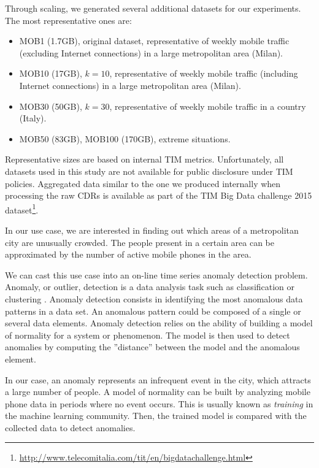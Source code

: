 {Through scaling, we generated several additional datasets for our experiments. The most representative ones are:
\begin{itemize}
\item MOB1 (1.7GB), original dataset, representative of weekly mobile traffic (excluding Internet connections) in a large metropolitan area (Milan).
\item MOB10 (17GB), $k = 10$, representative of weekly mobile traffic (including Internet connections) in a large metropolitan area (Milan).
\item MOB30 (50GB), $k = 30$, representative of weekly mobile traffic in a country (Italy).
\item MOB50 (83GB), MOB100 (170GB), extreme situations.
\end{itemize}
Representative sizes are based on internal TIM metrics. Unfortunately, all datasets used in this study are not available for public disclosure under TIM policies. Aggregated data similar to the one we produced internally when processing the raw CDRs is available as part of the TIM Big Data challenge 2015 dataset\footnote{\url{http://www.telecomitalia.com/tit/en/bigdatachallenge.html}}.

In our use case, we are interested in finding out which areas of a metropolitan city are unusually crowded. The people present in a certain area can be approximated by the number of active mobile phones in the area.

We can cast this use case into an on-line time series anomaly detection problem. Anomaly, or outlier, detection is a data analysis task such as classification or clustering \cite{aggarwal2015outlier}. Anomaly detection consists in identifying the most anomalous data patterns in a data set. An anomalous pattern could be composed of a single or several data elements. Anomaly detection relies on the ability of building a model of normality for a system or phenomenon. The model is then used to detect anomalies by computing the ''distance'' between the model and the anomalous element.

In our case, an anomaly represents an infrequent event in the city, which attracts a large number of people. A model of normality can be built by analyzing mobile phone data in periods where no event occurs. This is usually known as \textit{training} in the machine learning community. Then, the trained model is compared with the collected data to detect anomalies.

}
